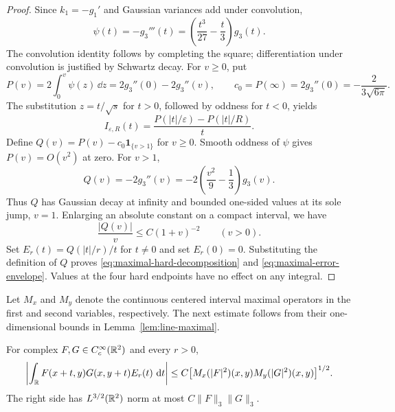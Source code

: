\begin{proof}
Since $k_1=-g_1'$ and Gaussian variances add under convolution,
\[
 \psi(t)=-g_3'''(t)
        =\left(\frac{t^3}{27}-\frac t3\right)g_3(t).
\]
The convolution identity follows by completing the square;
differentiation under convolution is justified by Schwartz decay.
For $v\ge0$, put
\[
 P(v)=2\int_0^v\psi(z)\,\dd z
     =2g_3''(0)-2g_3''(v),\qquad
 c_0=P(\infty)=2g_3''(0)=-\frac2{3\sqrt{6\pi}}.
\]
The substitution $z=t/\sqrt{s}$ for $t>0$, followed by oddness for
$t<0$, yields
\[
 I_{\varepsilon,R}(t)
   =\frac{P(|t|/\varepsilon)-P(|t|/R)}{t}.
\]
Define $Q(v)=P(v)-c_0\mathbf1_{\{v>1\}}$ for $v\ge0$.
Smooth oddness of $\psi$ gives $P(v)=O(v^2)$ at zero. For $v>1$,
\[
 Q(v)=-2g_3''(v)
      =-2\left(\frac{v^2}{9}-\frac13\right)g_3(v).
\]
Thus $Q$ has Gaussian decay at infinity and bounded one-sided values
at its sole jump, $v=1$. Enlarging an absolute constant on a compact
interval, we have
\[
 \frac{|Q(v)|}{v}\le C(1+v)^{-2}\qquad(v>0).
\]
Set $E_r(t)=Q(|t|/r)/t$ for $t\ne0$ and set $E_r(0)=0$.
Substituting the definition of $Q$ proves
\eqref{eq:maximal-hard-decomposition} and
\eqref{eq:maximal-error-envelope}. Values at the four hard endpoints
have no effect on any integral.
\end{proof}

Let $M_x$ and $M_y$ denote the continuous centered interval maximal
operators in the first and second variables, respectively. The next
estimate follows from their one-dimensional bounds in
Lemma~\ref{lem:line-maximal}.

\begin{lemma}\label{lem:pointwise-endpoint-error}
For complex $F,G\in C_c^\infty(\mathbb R^2)$ and every $r>0$,
\[
 \left|\int_\mathbb R F(x+t,y)G(x,y+t)E_r(t)\,\mathop{}\!\mathrm d t\right|
 \le C\bigl[M_x(|F|^2)(x,y)M_y(|G|^2)(x,y)\bigr]^{1/2}.
\]
The right side has $L^{3/2}(\mathbb R^2)$ norm at most $C\|F\|_3\|G\|_3$.
\end{lemma}

